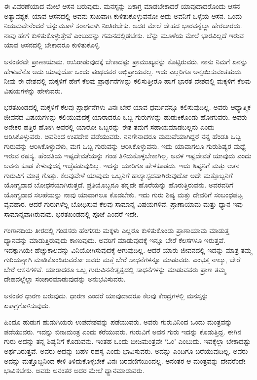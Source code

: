 ಈ ವಿವರಣೆಯಾದ ಮೇಲೆ ಆಸನ ಬರುವುದು. ಮನಸ್ಸನ್ನು ಏಕಾಗ್ರ ಮಾಡಬೇಕಾದರೆ ಯಾವುದಾದರೊಂದು ಆಸನ ಅತ್ಯಾವಶ್ಯಕ. ಯಾವ ಆಸನದಲ್ಲಿ ಅವನು ಸುಖವಾಗಿ ಕುಳಿತುಕೊಳ್ಳುವನೋ ಅದು ಅವನಿಗೆ ಒಳ್ಳೆಯ ಆಸನ. ಒಂದು ನಿಯಮವೇನೆಂದರೆ ಬೆನ್ನುಮೂಳೆ ಸರಾಗವಾಗಿ ನಿಂತಿರಬೇಕು. ಅದರ ಮೇಲೆ ದೇಹದ ಭಾರವನ್ನೆಲ್ಲಾ ಹೇರಬಾರದು. ನಾವು ಹೇಗೆ ಕುಳಿತುಕೊಳ್ಳುತ್ತೇವೆ ಎಂಬುದನ್ನು ಗಮನದಲ್ಲಿಡಬೇಕು. ಬೆನ್ನು ಮೂಳೆಯ ಮೇಲೆ ಭಾರವಿಲ್ಲದೆ ಇರುವ ಯಾವ ಆಸನದಲ್ಲಿ ಬೇಕಾದರೂ ಕುಳಿತುಕೊಳ್ಳಿ.

ಅನಂತರವೇ ಪ್ರಾಣಾಯಾಮ. ಉಸಿರಾಡುವುದಕ್ಕೆ ಬೇಕಾದಷ್ಟು ಪ್ರಾಮುಖ್ಯವನ್ನು ಕೊಟ್ಟಿರುವರು. ನಾನು ನಿಮಗೆ ಏನನ್ನು ಹೇಳುವೆನೊ ಅದು ಯಾವುದೋ ಒಂದು ಪಂಥದವರ ಅಭಿಪ್ರಾಯವಲ್ಲ. ಇದು ಎಲ್ಲರಿಗೂ ಅನ್ವಯಿಸುವಂತಹುದು. ನೀವು ಈ ದೇಶದಲ್ಲಿ ಮಕ್ಕಳಿಗೆ ಹೇಗೆ ಕೆಲವು ಪ್ರಾರ್ಥನೆಗಳನ್ನು ಕಲಿಸುತ್ತೀರೊ ಹಾಗೆ ಭಾರತ ದೇಶದಲ್ಲಿ ಮಕ್ಕಳಿಗೆ ಕೆಲವು ವಿಷಯಗಳನ್ನು ಹೇಳುವರು.

ಭರತಖಂಡದಲ್ಲಿ ಮಕ್ಕಳಿಗೆ ಕೆಲವು ಪ್ರಾರ್ಥನೆಗಳು ವಿನಃ ಬೇರೆ ಯಾವ ಧರ್ಮವನ್ನೂ ಕಲಿಸುವುದಿಲ್ಲ. ಅವರು ಆಧ್ಯಾತ್ಮಿಕ ಜೀವನದ ವಿಷಯಗಳನ್ನು ಕಲಿಯುವುದಕ್ಕೆ ಯಾರಾದರೂ ಒಬ್ಬ ಗುರುಗಳನ್ನು ಹುಡುಕಿಕೊಂಡು ಹೋಗುವರು. ಅವರು ಅನೇಕರ ಹತ್ತಿರ ಹೋಗಿ ಅವರಲ್ಲಿ ಯಾರೋ ಒಬ್ಬರನ್ನು ಈತ ತಮಗೆ ಸಹಾಯಮಾಡಬಲ್ಲನು ಎಂದು ಆರಿಸಿಕೊಳ್ಳುವರು. ಅವನಿಂದ ಉಪದೇಶ ಪಡೆಯುವರು. ನನಗೇನಾದರೂ ಮದುವೆಯಾಗಿದ್ದರೆ ನನ್ನ ಹೆಂಡತಿ ಒಬ್ಬ ಗುರುವನ್ನು ಆರಿಸಿಕೊಳ್ಳುವಳು, ಮಗ ಒಬ್ಬ ಗುರುವನ್ನು ಆರಿಸಿಕೊಳ್ಳುವನು. ಇದು ಯಾವಾಗಲೂ ಗುರುಶಿಷ್ಯರ ಮಧ್ಯೆ ಇರುವ ರಹಸ್ಯ. ಹೆಂಡತಿಯ ಇಷ್ಟದೇವತೆಯನ್ನು ಗಂಡ ತಿಳಿದುಕೊಳ್ಳಬೇಕಾಗಿಲ್ಲ. ಅವಳ ಇಷ್ಟದೇವತೆ ಯಾವುದು ಎಂದು ಅವನು ಕೂಡ ಕೇಳುವುದಕ್ಕೆ ಇಚ್ಛೆಪಡುವುದಿಲ್ಲ. ಇದನ್ನು ಯಾರಿಗೂ ಹೇಳಕೂಡದು. ಇದು ಶಿಷ್ಯನಿಗೆ ಮತ್ತು ಆತನ ಗುರುವಿಗೆ ಮಾತ್ರ ಗೊತ್ತು. ಕೆಲವುವೇಳೆ ಯಾವುದು ಒಬ್ಬನಿಗೆ ಹಾಸ್ಯಾಸ್ಪದವಾಗಿರುವುದೋ ಅದೇ ಮತ್ತೊಬ್ಬನಿಗೆ ಯೋಗ್ಯವಾದ ಬೋಧನೆಯಾಗಿರುತ್ತದೆ. ಪ್ರತಿಯೊಬ್ಬನೂ ತನ್ನದೇ ಹೊರೆಯನ್ನು ಹೊರುತ್ತಿರುವನು. ಅವರವರಿಗೆ ಯೋಗ್ಯವಾದ ಸಲಹೆಯನ್ನು ನಾವು ಯಾವಾಗಲೂ ಕೊಡಬೇಕು. ಇದು ಗುರು ಶಿಷ್ಯ ಮತ್ತು ದೇವರಿಗೆ ಸಂಬಂಧಪಟ್ಟ ವ್ಯವಹಾರ. ಆದರೆ ಗುರುಗಳೆಲ್ಲ ಬೋಧಿಸುವ ಕೆಲವು ಸಾಮಾನ್ಯ ವಿಷಯಗಳಿವೆ. ಪ್ರಾಣಾಯಾಮ ಮತ್ತು ಧ್ಯಾನ ಇವು ಸಾಮಾನ್ಯವಾಗಿರುವುವು. ಭರತಖಂಡದಲ್ಲಿ ಪೂಜೆ ಎಂದರೆ ಇದೇ.

ಗಂಗಾನದಿಯ ತೀರದಲ್ಲಿ ಗಂಡಸರು ಹೆಂಗಸರು ಮಕ್ಕಳು ಎಲ್ಲರೂ ಕುಳಿತುಕೊಂಡು ಪ್ರಾಣಾಯಾಮ ಮಾಡುತ್ತ ಧ್ಯಾನವನ್ನು ಮಾಡುತ್ತಿರುವುದು ಕಾಣುವುದು. ಅವರಿಗೆ ಮಾಡುವುದಕ್ಕೆ ಇನ್ನೂ ಬೇರೆ ಕೆಲಸಗಳೂ ಇರುತ್ತವೆ. ಇದಕ್ಕಾಗಿಯೇ ಹೆಚ್ಚುಕಾಲವನ್ನು ವಿನಿಯೋಗಿಸುವುದಕ್ಕೆ ಆಗುವುದಿಲ್ಲ. ಆದರೆ ಯಾರು ಜೀವನದಲ್ಲಿ ಇದನ್ನು ಮಾತ್ರ ತಮ್ಮ ಗುರಿಯನ್ನಾಗಿ ಮಾಡಿಕೊಂಡಿರುವರೋ ಅವರು ಮತ್ತೆ ಬೇರೆ ಸಾಧನೆಗಳನ್ನೂ ಮಾಡುವರು. ಎಂಭತ್ತ ನಾಲ್ಕು, ಬೇರೆ ಬೇರೆ ಆಸನಗಳಿವೆ. ಯಾರಾದರೂ ಒಬ್ಬ ಗುರುವಿನ\break ನೇತೃತ್ವದಲ್ಲಿ ಸಾಧನೆಗಳನ್ನು ಮಾಡುವವರು ಪ್ರಾಣ ತಮ್ಮ ದೇಹದಲ್ಲೆಲ್ಲಾ ಸಂಚಾರಮಾಡುವುದನ್ನು ಅನುಭವಿಸುವರು.

ಅನಂತರ ಧಾರಣ ಬರುವುದು. ಧಾರಣ ಎಂದರೆ ಯಾವುದಾದರೂ ಕೆಲವು ಕೇಂದ್ರಗಳಲ್ಲಿ ಮನಸ್ಸನ್ನು ಏಕಾಗ್ರಗೊಳಿಸುವುದು.

ಹಿಂದೂ ಹುಡುಗ ಹುಡುಗಿಯರು ಉಪದೇಶವನ್ನು ಪಡೆಯುವರು. ಅವರು ಗುರುವಿನಿಂದ ಒಂದು ಮಂತ್ರವನ್ನು ಪಡೆಯುವರು. ಇದನ್ನು ಬೀಜಮಂತ್ರ ಎಂದು ಕರೆಯುವರು. ಗುರುವಿಗೆ ಅವನ ಗುರು ಇದನ್ನು ಕೊಡುತ್ತಿದ್ದ. ಈಗಿನ ಗುರು ಅದನ್ನು ತನ್ನ ಶಿಷ್ಯನಿಗೆ ಕೊಡುವನು. ಇಂತಹ ಒಂದು ಬೀಜಮಂತ್ರವೇ `ಓಂ' ಎಂಬುದು. ಇವಕ್ಕೆಲ್ಲಾ ಬೇಕಾದಷ್ಟು ಅರ್ಥವಿರುತ್ತವೆ. ಅವರು ಅದನ್ನು ಬಹಳ ರಹಸ್ಯ ಎಂದು ಭಾವಿಸುವರು. ಅದನ್ನು ಎಂದಿಗೂ ಬರೆಯುವುದಿಲ್ಲ. ಅವರು ಅದನ್ನು ಮತ್ತೊಬ್ಬನಿಂದ ಕೇಳಿ ತಿಳಿದುಕೊಳ್ಳಬೇಕೆ ವಿನಃ ಬರವಣಿಗೆಯಿಂದಲ್ಲ. ಅನಂತರ ಆ ಮಂತ್ರವನ್ನು ದೇವರೆಂದೇ ಭಾವಿಸಬೇಕು. ಅವರು ಅನಂತರ ಅದರ ಮೇಲೆ ಧ್ಯಾನಮಾಡುವರು.

